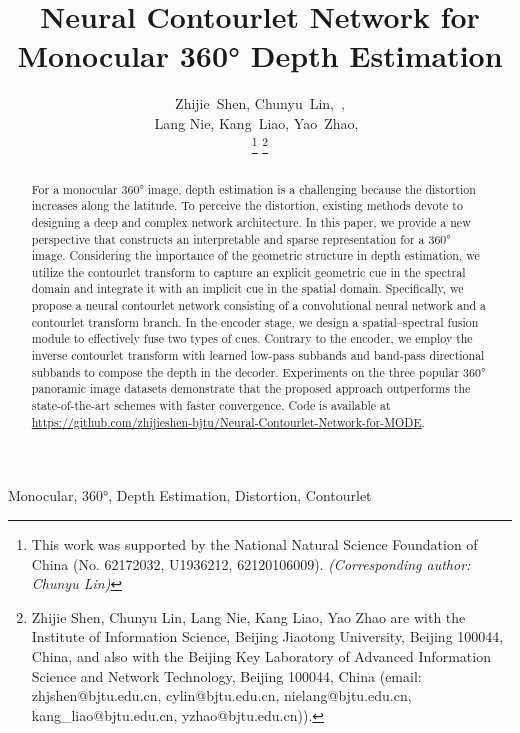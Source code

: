 \documentclass[10pt,times,mathptm,psfig,twocolumn,journals]{IEEEtran}
\begin{document}
\title{Neural Contourlet Network for Monocular 360° Depth Estimation}




\author{Zhijie~Shen, Chunyu~Lin,~, 

Lang Nie,
Kang~Liao, Yao~Zhao,~













\thanks{This work was supported by the National Natural Science Foundation of China (No. 62172032, U1936212, 62120106009).
\textit{(Corresponding author: Chunyu Lin)}}
\thanks{Zhijie Shen, Chunyu Lin, Lang Nie, Kang Liao, Yao Zhao are with the Institute of Information Science, Beijing Jiaotong University, Beijing 100044, China, and also with the Beijing Key Laboratory of Advanced Information Science and Network Technology, Beijing 100044, China (email: zhjshen@bjtu.edu.cn, cylin@bjtu.edu.cn, nielang@bjtu.edu.cn, kang\_liao@bjtu.edu.cn, yzhao@bjtu.edu.cn)).}}



\maketitle

\begin{abstract}
     For a monocular 360° image, depth estimation is a challenging because the distortion increases along the latitude. To perceive the distortion, existing methods devote to designing a deep and complex network architecture. In this paper, we provide a new perspective that constructs an interpretable and sparse representation for a 360° image. Considering the importance of the geometric structure in depth estimation, we utilize the contourlet transform to capture an explicit geometric cue in the spectral domain and integrate it with an implicit cue in the spatial domain. 
     Specifically, we propose a neural contourlet network consisting of a convolutional neural network and a contourlet transform branch. In the encoder stage, we design a spatial–spectral fusion module to effectively fuse two types of cues. Contrary to the encoder, we employ the inverse contourlet transform with learned low-pass subbands and band-pass directional subbands to compose the depth in the decoder.
     Experiments on the three popular 360° panoramic image datasets demonstrate that the proposed approach outperforms the state-of-the-art schemes with faster convergence. Code is available at \url{https://github.com/zhijieshen-bjtu/Neural-Contourlet-Network-for-MODE}.
\end{abstract}
\begin{IEEEkeywords}
   Monocular, 360°, Depth Estimation, Distortion, Contourlet
\end{IEEEkeywords}
\IEEEpeerreviewmaketitle
\end{document}
